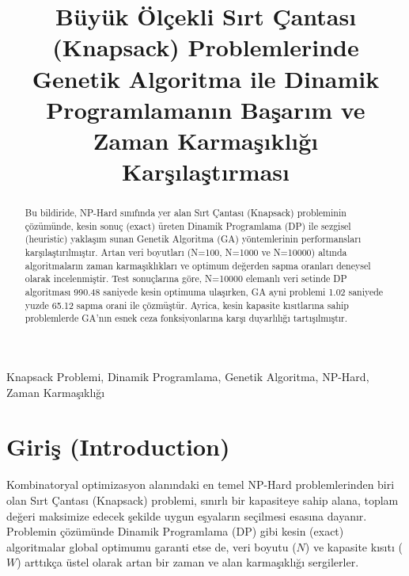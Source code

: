 \documentclass[conference]{IEEEtran}
\begin{document}
\title{Büyük Ölçekli Sırt Çantası (Knapsack) Problemlerinde Genetik Algoritma ile Dinamik Programlamanın Başarım ve Zaman Karmaşıklığı Karşılaştırması}

\author{
\and
{}
\and
{}
}
\maketitle

\begin{abstract}
Bu bildiride, NP-Hard sınıfında yer alan Sırt Çantası (Knapsack) probleminin çözümünde, kesin sonuç (exact) üreten Dinamik Programlama (DP) ile sezgisel (heuristic) yaklaşım sunan Genetik Algoritma (GA) yöntemlerinin performansları karşılaştırılmıştır. Artan veri boyutları (N=100, N=1000 ve N=10000) altında algoritmaların zaman karmaşıklıkları ve optimum değerden sapma oranları deneysel olarak incelenmiştir. Test sonuçlarına göre, N=10000 elemanlı veri setinde DP algoritması 990.48 saniyede kesin optimuma ulaşırken, GA ayni problemi 1.02 saniyede yuzde 65.12 sapma orani ile çözmüştür. Ayrica, kesin kapasite kısıtlarına sahip problemlerde GA'nın esnek ceza fonksiyonlarına karşı duyarlılığı tartışılmıştır.
\end{abstract}

\begin{IEEEkeywords}
Knapsack Problemi, Dinamik Programlama, Genetik Algoritma, NP-Hard, Zaman Karmaşıklığı
\end{IEEEkeywords}

\section{Giriş (Introduction)}
Kombinatoryal optimizasyon alanındaki en temel NP-Hard problemlerinden biri olan Sırt Çantası (Knapsack) problemi, sınırlı bir kapasiteye sahip alana, toplam değeri maksimize edecek şekilde uygun eşyaların seçilmesi esasına dayanır. Problemin çözümünde Dinamik Programlama (DP) gibi kesin (exact) algoritmalar global optimumu garanti etse de, veri boyutu ($N$) ve kapasite kısıtı ($W$) arttıkça üstel olarak artan bir zaman ve alan karmaşıklığı sergilerler.
\end{document}
